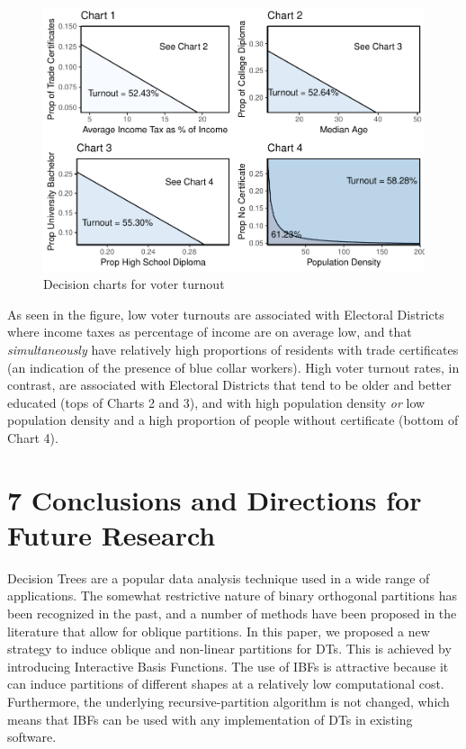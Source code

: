 \documentclass[]{elsarticle} %
\makeatletter
\def\maxwidth{\ifdim\Gin@nat@width>\linewidth\linewidth
\else\Gin@nat@width\fi}
\let\Oldincludegraphics\includegraphics
\renewcommand{\includegraphics}[1]{\Oldincludegraphics[width=\maxwidth]{#1}}
\makeatother
\begin{document}
\begin{figure}
\centering
\includegraphics{Trees_with_Base_Functions_v3_files/figure-latex/fig28-election-decision-charts-1.pdf}
\caption{\label{fig:fig28-election-decision-charts}Decision charts for
voter turnout}
\end{figure}

As seen in the figure, low voter turnouts are associated with Electoral
Districts where income taxes as percentage of income are on average low,
and that \emph{simultaneously} have relatively high proportions of
residents with trade certificates (an indication of the presence of blue
collar workers). High voter turnout rates, in contrast, are associated
with Electoral Districts that tend to be older and better educated (tops
of Charts 2 and 3), and with high population density \emph{or} low
population density and a high proportion of people without certificate
(bottom of Chart 4).

\section{7 Conclusions and Directions for Future
Research}\label{conclusions-and-directions-for-future-research}

Decision Trees are a popular data analysis technique used in a wide
range of applications. The somewhat restrictive nature of binary
orthogonal partitions has been recognized in the past, and a number of
methods have been proposed in the literature that allow for oblique
partitions. In this paper, we proposed a new strategy to induce oblique
and non-linear partitions for DTs. This is achieved by introducing
Interactive Basis Functions. The use of IBFs is attractive because it
can induce partitions of different shapes at a relatively low
computational cost. Furthermore, the underlying recursive-partition
algorithm is not changed, which means that IBFs can be used with any
implementation of DTs in existing software.
\end{document}
